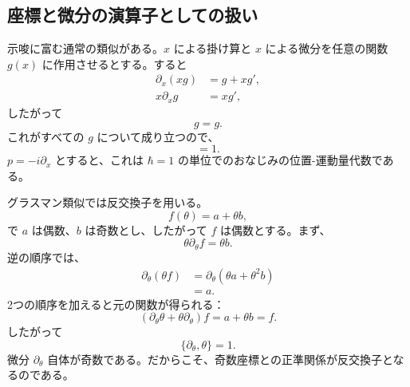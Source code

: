 \subsection{座標と微分の演算子としての扱い}

示唆に富む通常の類似がある。\(x\) による掛け算と \(x\) による微分を任意の関数 \(g(x)\) に作用させるとする。すると
\begin{align}
\partial_x\!\left(xg\right)&=g+xg',\\
x\partial_xg&=xg',
\end{align}
したがって
\begin{equation}
[\partial_x,x]g=g.
\end{equation}
これがすべての \(g\) について成り立つので、
\begin{equation}
[\partial_x,x]=1.
\end{equation}
\(p=-i\partial_x\) とすると、これは \(\hbar=1\) の単位でのおなじみの位置-運動量代数である。

グラスマン類似では反交換子を用いる。
\begin{equation}
f(\theta)=a+\theta b,
\end{equation}
で \(a\) は偶数、\(b\) は奇数とし、したがって \(f\) は偶数とする。まず、
\begin{equation}
\theta\partial_\theta f=\theta b.
\end{equation}
逆の順序では、
\begin{align}
\partial_\theta(\theta f)
&=\partial_\theta(\theta a+\theta^2b)\\
&=a.
\end{align}
2つの順序を加えると元の関数が得られる：
\begin{equation}
\left(\partial_\theta\theta+\theta\partial_\theta\right)f
=a+\theta b=f.
\end{equation}
したがって
\begin{equation}
\boxed{\{\partial_\theta,\theta\}=1.}
\end{equation}
微分 \(\partial_\theta\) 自体が奇数である。だからこそ、奇数座標との正準関係が反交換子となるのである。

\begin{classroomqa}
\end{classroomqa}

